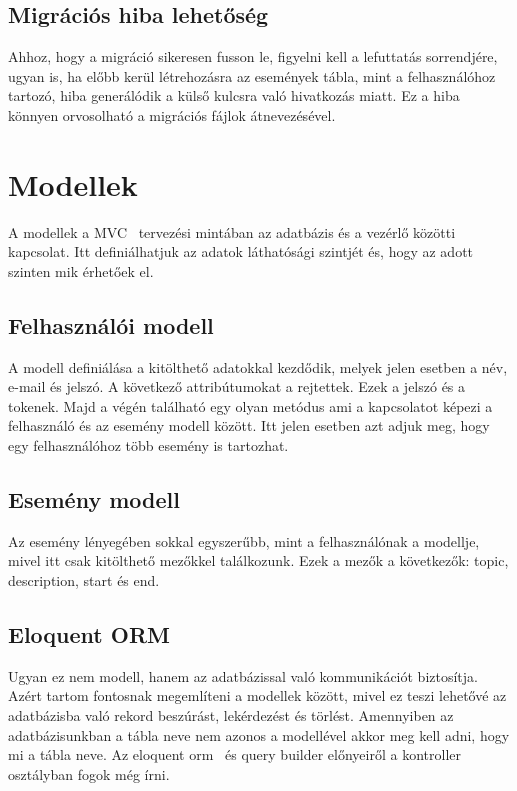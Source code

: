 \documentclass[
]{thesis-ekf}
\theoremstyle{definition}
\theoremstyle{remark}
\begin{document}
	\subsection{Migrációs hiba lehetőség}
	Ahhoz, hogy a migráció sikeresen fusson le, figyelni kell a lefuttatás sorrendjére, ugyan is, ha előbb kerül létrehozásra az események tábla, mint a felhasználóhoz tartozó, hiba generálódik a külső kulcsra való hivatkozás miatt. Ez a hiba könnyen orvosolható a migrációs fájlok átnevezésével.
	
	\section{Modellek}
	A modellek a MVC~\cite{mvc_mozzilla} tervezési mintában az adatbázis és a vezérlő közötti kapcsolat. Itt definiálhatjuk az adatok láthatósági szintjét és, hogy az adott szinten mik érhetőek el.
	
	\subsection{Felhasználói modell}
	A modell definiálása a kitölthető adatokkal kezdődik, melyek jelen esetben a név, e-mail és jelszó. A következő attribútumokat a rejtettek. Ezek a jelszó és a tokenek. Majd a végén található egy olyan metódus ami a kapcsolatot képezi a felhasználó és az esemény modell között. Itt jelen esetben azt adjuk meg, hogy egy felhasználóhoz több esemény is tartozhat.
	
	\subsection{Esemény modell}
	Az esemény lényegében sokkal egyszerűbb, mint a felhasználónak a modellje, mivel itt csak kitölthető mezőkkel találkozunk. Ezek a mezők a következők: topic, description, start és end.
	
	\subsection{Eloquent ORM}
	Ugyan ez nem modell, hanem az adatbázissal való kommunikációt biztosítja. Azért tartom fontosnak megemlíteni a modellek között, mivel ez teszi lehetővé az adatbázisba való rekord beszúrást, lekérdezést és törlést. Amennyiben az adatbázisunkban a tábla neve nem azonos a modellével akkor meg kell adni, hogy mi a tábla neve. Az eloquent orm~\cite{laravel_eloquent} és query builder előnyeiről a kontroller osztályban fogok még írni.
	
\end{document}
